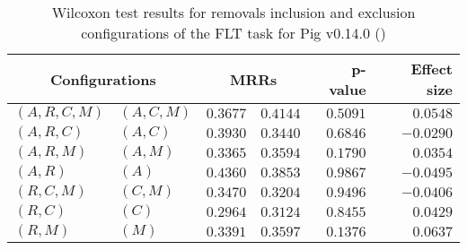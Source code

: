 
\begin{table}
\begin{spacing}{1.2}
\centering
\caption{Wilcoxon test results for removals inclusion and exclusion configurations of the FLT task for Pig v0.14.0 (\ctwo)}
\label{table:versus-wilcox-pig-flt-removals}
\begin{tabular}{ll|rr|rr}
\toprule
      \multicolumn{2}{c|}{Configurations} &                \multicolumn{2}{c|}{MRRs} &             p-value & Effect size \\
\midrule
 $(A,R,C,M)$ &  $(A,C,M)$ &       $0.3677$ &  $\bm{0.4144}$ & $0.5091$ &    $0.0548$ \\
   $(A,R,C)$ &    $(A,C)$ &  $\bm{0.3930}$ &       $0.3440$ & $0.6846$ &   $-0.0290$ \\
   $(A,R,M)$ &    $(A,M)$ &       $0.3365$ &  $\bm{0.3594}$ & $0.1790$ &    $0.0354$ \\
     $(A,R)$ &      $(A)$ &  $\bm{0.4360}$ &       $0.3853$ & $0.9867$ &   $-0.0495$ \\
   $(R,C,M)$ &    $(C,M)$ &  $\bm{0.3470}$ &       $0.3204$ & $0.9496$ &   $-0.0406$ \\
     $(R,C)$ &      $(C)$ &       $0.2964$ &  $\bm{0.3124}$ & $0.8455$ &    $0.0429$ \\
     $(R,M)$ &      $(M)$ &       $0.3391$ &  $\bm{0.3597}$ & $0.1376$ &    $0.0637$ \\
\bottomrule
\end{tabular}

\end{spacing}
\end{table}

